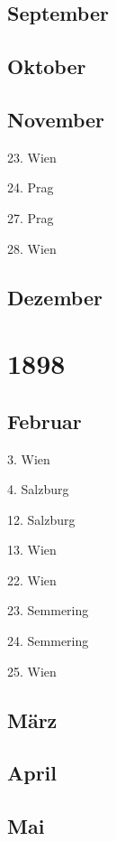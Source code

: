 \documentclass[twoside=false,titlepage=false,open=any, parskip=never, fontsize=10pt, headings=small, chapterprefix=false, appendixprefix=false, DIV=15]{scrbook}
\begin{document}
\begin{multicols}{3}
            \section*{September}
            \section*{Oktober}
            \section*{November}
            23. Wien\par
            24. Prag\par
            27. Prag\par
            28. Wien\par
            \section*{Dezember}
            \chapter*{1898}
            \section*{Februar}
            3. Wien\par
            4. Salzburg\par
            12. Salzburg\par
            13. Wien\par
            22. Wien\par
            23. Semmering\par
            24. Semmering\par
            25. Wien\par
            \section*{März}
            \section*{April}
            \section*{Mai}

\end{multicols}
\end{document}
